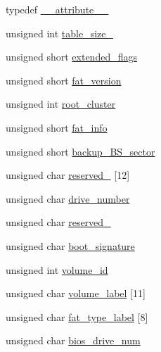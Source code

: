 \begin{DoxyCompactItemize}
\item 
typedef \hyperlink{a00152_a9a3a2a951fb76d806466ff79a3f0d426_a9a3a2a951fb76d806466ff79a3f0d426}{\+\_\+\+\_\+attribute\+\_\+\+\_\+}
\item 
unsigned int \hyperlink{a00152_a8202591d7b2208a5bb4e8c6848531b00_a8202591d7b2208a5bb4e8c6848531b00}{table\+\_\+size\+\_}
\item 
unsigned short \hyperlink{a00152_ae8c15edc2703a5ba547781b864448b0c_ae8c15edc2703a5ba547781b864448b0c}{extended\+\_\+flags}
\item 
unsigned short \hyperlink{a00152_ab4a262a3a624c702e31a66fd3602a60d_ab4a262a3a624c702e31a66fd3602a60d}{fat\+\_\+version}
\item 
unsigned int \hyperlink{a00152_a33393065e24bc94ce2089fb86245206a_a33393065e24bc94ce2089fb86245206a}{root\+\_\+cluster}
\item 
unsigned short \hyperlink{a00152_a5515272b43d122d7239d4996216e9080_a5515272b43d122d7239d4996216e9080}{fat\+\_\+info}
\item 
unsigned short \hyperlink{a00152_aa5aeb1cf34efa1857e5384685d938548_aa5aeb1cf34efa1857e5384685d938548}{backup\+\_\+\+B\+S\+\_\+sector}
\item 
unsigned char \hyperlink{a00152_a9be1862088e39957378b98c43222fc0d_a9be1862088e39957378b98c43222fc0d}{reserved\+\_} \mbox{[}12\mbox{]}
\item 
unsigned char \hyperlink{a00152_ace7cd596c41a03630b828ad71042c645_ace7cd596c41a03630b828ad71042c645}{drive\+\_\+number}
\item 
unsigned char \hyperlink{a00152_aed9514b6f698ccf6462bd8b35a6adbad_aed9514b6f698ccf6462bd8b35a6adbad}{reserved\+\_}
\item 
unsigned char \hyperlink{a00152_acd0f56b390c96dd1fc27c96d932583cc_acd0f56b390c96dd1fc27c96d932583cc}{boot\+\_\+signature}
\item 
unsigned int \hyperlink{a00152_a35fa9e629267c027e1e46e4b354b6764_a35fa9e629267c027e1e46e4b354b6764}{volume\+\_\+id}
\item 
unsigned char \hyperlink{a00152_ac1eef402f95fa102ed4c38f0c791c1c1_ac1eef402f95fa102ed4c38f0c791c1c1}{volume\+\_\+label} \mbox{[}11\mbox{]}
\item 
unsigned char \hyperlink{a00152_a587b2173d93330812c7d467613e05372_a587b2173d93330812c7d467613e05372}{fat\+\_\+type\+\_\+label} \mbox{[}8\mbox{]}
\item 
unsigned char \hyperlink{a00152_ad9190db73466d476ce9c6d7edb2a23d5_ad9190db73466d476ce9c6d7edb2a23d5}{bios\+\_\+drive\+\_\+num}

\end{DoxyCompactItemize}

